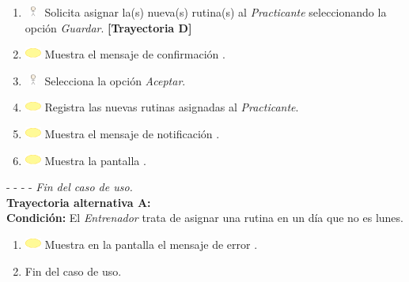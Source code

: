 \begin{enumerate}
	\item \includegraphics[width=15pt, height=10pt]{./Figuras/iconosCU/usuario.png} Solicita asignar la(s) nueva(s) rutina(s) al \textit{Practicante} seleccionando la opción \textit{Guardar}. \textbf{[Trayectoria D]} 
	\item \includegraphics[width=15pt]{./Figuras/iconosCU/herramienta.png} Muestra el mensaje de confirmación .
	\item \includegraphics[width=15pt, height=10pt]{./Figuras/iconosCU/usuario.png} Selecciona la opción \textit{Aceptar}.
	\item \includegraphics[width=15pt]{./Figuras/iconosCU/herramienta.png} Registra las nuevas rutinas asignadas al \textit{Practicante}.
	\item \includegraphics[width=15pt]{./Figuras/iconosCU/herramienta.png} Muestra el mensaje de notificación .
	\item \includegraphics[width=15pt]{./Figuras/iconosCU/herramienta.png} Muestra la pantalla . 
\end{enumerate}
	
- - - - \textit{Fin del caso de uso.} \\

\textbf{\large{Trayectoria alternativa A:}}\\
\textbf{Condición: } El \textit{Entrenador} trata de asignar una rutina en un día que no es lunes.

\begin{enumerate}
	\item \includegraphics[width=15pt]{./Figuras/iconosCU/herramienta.png} Muestra en la pantalla  el mensaje de error .
	\item Fin del caso de uso.
\end{enumerate}

